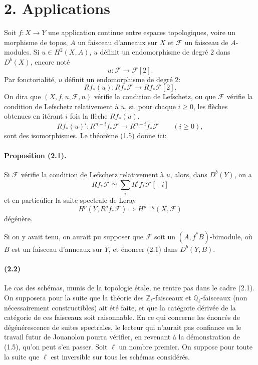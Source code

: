 \documentclass[10pt]{article}
\newcommand{\Fcal}{\mathcal F}
\newcommand{\Z}{\mathbb Z}
\newcommand{\Q}{\mathbb Q}
\newcommand{\og}{\guillemotleft}
\newcommand{\fg}{\guillemotright}
\providecommand{\og}{\guillemotleft}
\providecommand{\fg}{\guillemotright}
\begin{document}
\section*{2. Applications}

Soit $f:X\to Y$ une application continue entre espaces topologiques, voire un morphisme de topos, $A$ un faisceau d'anneaux sur $X$ et $\Fcal$ un faisceau de $A$-modules. Si $u\in H^2(X,A)$, $u$ définit un endomorphisme de degré $2$ dans $D^b(X)$, encore noté
\[
u:\Fcal\longrightarrow\Fcal[2].
\]
Par fonctorialité, $u$ définit un endomorphisme de degré $2$:
\[
Rf_*(u):Rf_*\Fcal\longrightarrow Rf_*\Fcal[2].
\]
On dira que $(X,f,u,\Fcal,n)$ vérifie la condition de Lefschetz, ou que $\Fcal$ vérifie la condition de Lefschetz relativement à $u$, si, pour chaque $i\ge0$, les flèches obtenues en itérant $i$ fois la flèche $Rf_*(u)$,
\[
Rf_*(u)^i:R^{n-i}f_*\Fcal\longrightarrow R^{n+i}f_*\Fcal\qquad(i\ge0),
\]
sont des isomorphismes. Le théorème (1.5) donne ici:

\paragraph{Proposition (2.1).} Si $\Fcal$ vérifie la condition de Lefschetz relativement à $u$, alors, dans $D^b(Y)$, on a
\[
Rf_*\Fcal\simeq\sum_iR^if_*\Fcal[-i]
\]
et en particulier la suite spectrale de Leray
\[
H^p(Y,R^qf_*\Fcal)\Longrightarrow H^{p+q}(X,\Fcal)
\]
dégénère.

Si on y avait tenu, on aurait pu supposer que $\Fcal$ soit un $(A,f^*B)$-bimodule, où $B$ est un faisceau d'anneaux sur $Y$, et énoncer (2.1) dans $D^b(Y,B)$.

\paragraph{(2.2)} Le cas des schémas, munis de la topologie étale, ne rentre pas dans le cadre (2.1). On supposera pour la suite que la théorie des $\Z_\ell$-faisceaux et $\Q_\ell$-faisceaux (non nécessairement constructibles) ait été faite, et que la catégorie dérivée de la catégorie de ces \og faisceaux\fg{} soit raisonnable. En ce qui concerne les énoncés de dégénérescence de suites spectrales, le lecteur qui n'aurait pas confiance en le travail futur de Jouanolou pourra vérifier, en revenant à la démonstration de (1.5), qu'on peut s'en passer. Soit $\ell$ un nombre premier. On suppose pour toute la suite que $\ell$ est inversible sur tous les schémas considérés.
\end{document}
